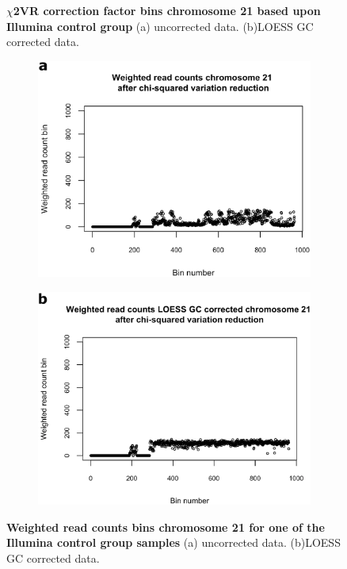 \begin{figure}[h]
\begin{subfigure}{.5\textwidth}
		\label{fig:NIPT_Supp1_Fig1_4b}
	\end{subfigure} 
	\caption[Example $\chi$2VR correction factor]{\textbf{$\chi$2VR correction factor bins chromosome 21 based upon Illumina control group} (a) uncorrected data. (b)LOESS GC corrected data.}
	\label{fig:NIPT_Supp1_Fig1_4}
\end{figure}

\begin{figure}[h]
	\begin{subfigure}{.5\textwidth}
		\centering
		\includegraphics[width=1\linewidth]{img/NIPT_Supp1_Fig1_5a}
		\label{fig:NIPT_Supp1_Fig1_5a}
	\end{subfigure}%
	\begin{subfigure}{.5\textwidth}
		\centering
		\includegraphics[width=1\linewidth]{img/NIPT_Supp1_Fig1_5b}
		\label{fig:NIPT_Supp1_Fig1_5b}
	\end{subfigure} 
	\caption[Example Weighted read counts after $\chi$2VR]{\textbf{Weighted read counts bins chromosome 21 for one of the Illumina control group samples} (a) uncorrected data. (b)LOESS GC corrected data.}
	\label{fig:NIPT_Supp1_Fig1_5}
\end{figure}

